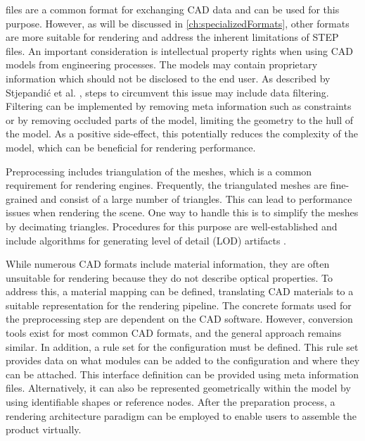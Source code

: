  files are a common format for exchanging \gls{CAD} data and can be used for this purpose. However, as will be discussed in \autoref{ch:specializedFormats}, other formats are more suitable for rendering and address the inherent limitations of \gls{STEP} files. An important consideration is intellectual property rights when using \gls{CAD} models from engineering processes. The models may contain proprietary information which should not be disclosed to the end user. As described by Stjepandić et al. \cite{ipr}, steps to circumvent this issue may include data filtering. Filtering can be implemented by removing meta information such as constraints or by removing occluded parts of the model, limiting the geometry to the hull of the model. As a positive side-effect, this potentially reduces the complexity of the model, which can be beneficial for rendering performance.

Preprocessing includes triangulation of the meshes, which is a common requirement for rendering engines. Frequently, the triangulated meshes are fine-grained and consist of a large number of triangles. This can lead to performance issues when rendering the scene. One way to handle this is to simplify the meshes by decimating triangles. Procedures for this purpose are well-established and include algorithms for generating level of detail (\gls{LOD}) artifacts \cite{luebke2003level}.

While numerous \gls{CAD} formats include material information, they are often unsuitable for rendering because they do not describe optical properties. To address this, a material mapping can be defined, translating \gls{CAD} materials to a suitable representation for the rendering pipeline. The concrete formats used for the preprocessing step are dependent on the \gls{CAD} software. However, conversion tools exist for most common \gls{CAD} formats, and the general approach remains similar. In addition, a rule set for the configuration must be defined. This rule set provides data on what modules can be added to the configuration and where they can be attached. This interface definition can be provided using meta information files. Alternatively, it can also be represented geometrically within the model by using identifiable shapes or reference nodes. After the preparation process, a rendering architecture paradigm can be employed to enable users to assemble the product virtually.


